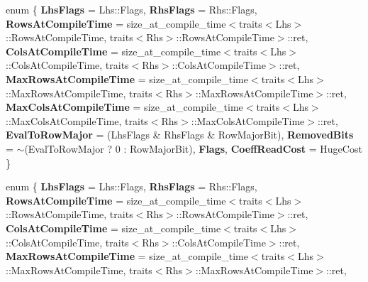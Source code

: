 \begin{DoxyCompactItemize}
\item 
\mbox{\label{struct_eigen_1_1internal_1_1traits_3_01_kronecker_product_sparse_3_01___lhs_00_01___rhs_01_4_01_4_a293106ae6b7ea70e954da2f81331771a}} 
enum \{ \newline
{\bfseries Lhs\+Flags} = Lhs\+:\+:Flags, 
{\bfseries Rhs\+Flags} = Rhs\+:\+:Flags, 
{\bfseries Rows\+At\+Compile\+Time} = size\+\_\+at\+\_\+compile\+\_\+time$<$traits$<$Lhs$>$\+:\+:Rows\+At\+Compile\+Time, traits$<$Rhs$>$\+:\+:Rows\+At\+Compile\+Time$>$\+:\+:ret, 
{\bfseries Cols\+At\+Compile\+Time} = size\+\_\+at\+\_\+compile\+\_\+time$<$traits$<$Lhs$>$\+:\+:Cols\+At\+Compile\+Time, traits$<$Rhs$>$\+:\+:Cols\+At\+Compile\+Time$>$\+:\+:ret, 
\newline
{\bfseries Max\+Rows\+At\+Compile\+Time} = size\+\_\+at\+\_\+compile\+\_\+time$<$traits$<$Lhs$>$\+:\+:Max\+Rows\+At\+Compile\+Time, traits$<$Rhs$>$\+:\+:Max\+Rows\+At\+Compile\+Time$>$\+:\+:ret, 
{\bfseries Max\+Cols\+At\+Compile\+Time} = size\+\_\+at\+\_\+compile\+\_\+time$<$traits$<$Lhs$>$\+:\+:Max\+Cols\+At\+Compile\+Time, traits$<$Rhs$>$\+:\+:Max\+Cols\+At\+Compile\+Time$>$\+:\+:ret, 
{\bfseries Eval\+To\+Row\+Major} = (Lhs\+Flags \& Rhs\+Flags \& Row\+Major\+Bit), 
{\bfseries Removed\+Bits} = $\sim$(Eval\+To\+Row\+Major ? 0 \+: Row\+Major\+Bit), 
\newline
{\bfseries Flags}, 
{\bfseries Coeff\+Read\+Cost} = Huge\+Cost
 \}
\item 
\mbox{\label{struct_eigen_1_1internal_1_1traits_3_01_kronecker_product_sparse_3_01___lhs_00_01___rhs_01_4_01_4_a1477e133beb4e4d15736f042e37c7b5e}} 
enum \{ \newline
{\bfseries Lhs\+Flags} = Lhs\+:\+:Flags, 
{\bfseries Rhs\+Flags} = Rhs\+:\+:Flags, 
{\bfseries Rows\+At\+Compile\+Time} = size\+\_\+at\+\_\+compile\+\_\+time$<$traits$<$Lhs$>$\+:\+:Rows\+At\+Compile\+Time, traits$<$Rhs$>$\+:\+:Rows\+At\+Compile\+Time$>$\+:\+:ret, 
{\bfseries Cols\+At\+Compile\+Time} = size\+\_\+at\+\_\+compile\+\_\+time$<$traits$<$Lhs$>$\+:\+:Cols\+At\+Compile\+Time, traits$<$Rhs$>$\+:\+:Cols\+At\+Compile\+Time$>$\+:\+:ret, 
\newline
{\bfseries Max\+Rows\+At\+Compile\+Time} = size\+\_\+at\+\_\+compile\+\_\+time$<$traits$<$Lhs$>$\+:\+:Max\+Rows\+At\+Compile\+Time, traits$<$Rhs$>$\+:\+:Max\+Rows\+At\+Compile\+Time$>$\+:\+:ret, 

\end{DoxyCompactItemize}
